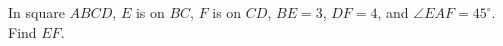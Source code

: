 In square $ABCD$, $E$ is on $BC$, $F$ is on $CD$, $BE=3$, $DF=4$, and $\angle EAF=45^\circ$. Find $EF$.
